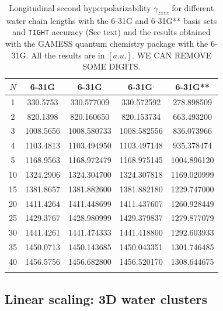 \documentclass[prl,aps,twocolumn,showpacs,twocolumngrid,superbib]{revtex4}
\begin{document}
\begin{table}
  \centering
  \caption{\protect
    Longitudinal second hyperpolarizability $\gamma_{zzzz}$
    for different water chain lengths with the 6-31G and 6-31G** basis sets
    and {\tt TIGHT} accuracy (See text) and the results obtained with
    the GAMESS quantum chemistry package \cite{gamess} with the 6-31G. 
    All the results are in $[a.u.]$.
    WE CAN REMOVE SOME DIGITS.
  }\label{tab:Gamma_1D_Values}
  \begin{tabular}{ccccc}
    \toprule
    $N$ &\multicolumn{1}{c}{6-31G\footnotemark[1]}
    &\multicolumn{1}{c}{6-31G\footnotemark[2]}
    &\multicolumn{1}{c}{6-31G\footnotemark[2]$^,$\footnotemark[3]}
    &\multicolumn{1}{c}{6-31G**\footnotemark[2]}\\
    \hline
     1 &  330.5753 &  330.577009 &  330.572592 &  278.898509 \\
     2 &  820.1398 &  820.160650 &  820.153734 &  663.493200 \\
     3 & 1008.5656 & 1008.580733 & 1008.582556 &  836.073966 \\
     4 & 1103.4813 & 1103.494950 & 1103.497148 &  935.378474 \\
     5 & 1168.9563 & 1168.972479 & 1168.975145 & 1004.896120 \\
    10 & 1324.2906 & 1324.304700 & 1324.307818 & 1169.020999 \\
    15 & 1381.8657 & 1381.882600 & 1381.882180 & 1229.747000 \\
    20 & 1411.4264 & 1411.448699 & 1411.437607 & 1260.928449 \\
    25 & 1429.3767 & 1428.980999 & 1429.379837 & 1279.877079 \\
    30 & 1441.4261 & 1441.474333 & 1441.418800 & 1292.603933 \\
    35 & 1450.0713 & 1450.143685 & 1450.043351 & 1301.746485 \\
    40 & 1456.5756 & 1456.682800 & 1456.520170 & 1308.644675 \\
    \botrule
  \end{tabular}
\end{table}



\subsection{Linear scaling: 3D water clusters}
\end{document}
